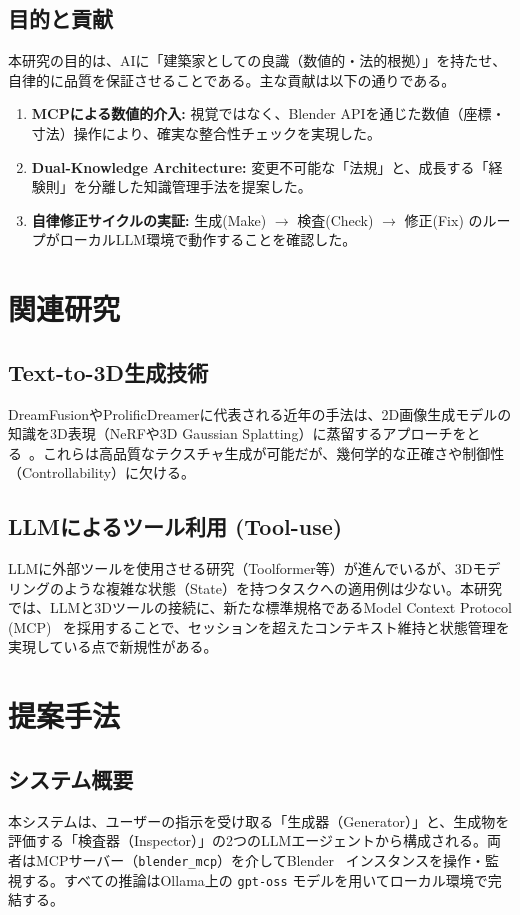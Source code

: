 \documentclass{deimj}
\begin{document}
\subsection{目的と貢献}
本研究の目的は、AIに「建築家としての良識（数値的・法的根拠）」を持たせ、自律的に品質を保証させることである。主な貢献は以下の通りである。
\begin{enumerate}
  \item \textbf{MCPによる数値的介入:} 視覚ではなく、Blender APIを通じた数値（座標・寸法）操作により、確実な整合性チェックを実現した。
  \item \textbf{Dual-Knowledge Architecture:} 変更不可能な「法規」と、成長する「経験則」を分離した知識管理手法を提案した。
  \item \textbf{自律修正サイクルの実証:} 生成(Make) $\to$ 検査(Check) $\to$ 修正(Fix) のループがローカルLLM環境で動作することを確認した。
\end{enumerate}

\section{関連研究}

\subsection{Text-to-3D生成技術}
DreamFusionやProlificDreamerに代表される近年の手法は、2D画像生成モデルの知識を3D表現（NeRFや3D Gaussian Splatting）に蒸留するアプローチをとる~\cite{DreamFusion}。これらは高品質なテクスチャ生成が可能だが、幾何学的な正確さや制御性（Controllability）に欠ける。

\subsection{LLMによるツール利用 (Tool-use)}
LLMに外部ツールを使用させる研究（Toolformer等）が進んでいるが、3Dモデリングのような複雑な状態（State）を持つタスクへの適用例は少ない。本研究では、LLMと3Dツールの接続に、新たな標準規格であるModel Context Protocol (MCP)~\cite{MCP} を採用することで、セッションを超えたコンテキスト維持と状態管理を実現している点で新規性がある。

\section{提案手法}

\subsection{システム概要}
本システムは、ユーザーの指示を受け取る「生成器（Generator）」と、生成物を評価する「検査器（Inspector）」の2つのLLMエージェントから構成される。両者はMCPサーバー（\texttt{blender\_mcp}）を介してBlender~\cite{Blender} インスタンスを操作・監視する。すべての推論はOllama上の \texttt{gpt-oss} モデルを用いてローカル環境で完結する。
\end{document}
